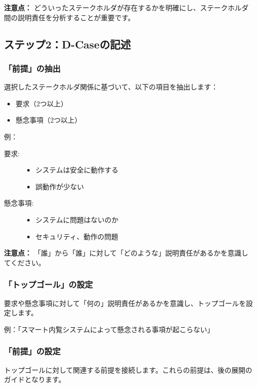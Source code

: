 \textbf{注意点：} どういったステークホルダが存在するかを明確にし、ステークホルダ間の説明責任を分析することが重要です。

\subsection{ステップ2：D-Caseの記述}

\subsubsection{「前提」の抽出}
選択したステークホルダ関係に基づいて、以下の項目を抽出します：
\begin{itemize}
    \item 要求（2つ以上）
    \item 懸念事項（2つ以上）
\end{itemize}

例：
\begin{description}
    \item[要求:] 
    \begin{itemize}
        \item システムは安全に動作する
        \item 誤動作が少ない
    \end{itemize}
    \item[懸念事項:] 
    \begin{itemize}
        \item システムに問題はないのか
        \item セキュリティ、動作の問題
    \end{itemize}
\end{description}

\textbf{注意点：} 「誰」から「誰」に対して「どのような」説明責任があるかを意識してください。

\subsubsection{「トップゴール」の設定}
要求や懸念事項に対して「何の」説明責任があるかを意識し、トップゴールを設定します。

例：「スマート内覧システムによって懸念される事項が起こらない」

\subsubsection{「前提」の設定}
トップゴールに対して関連する前提を接続します。これらの前提は、後の展開のガイドとなります。

